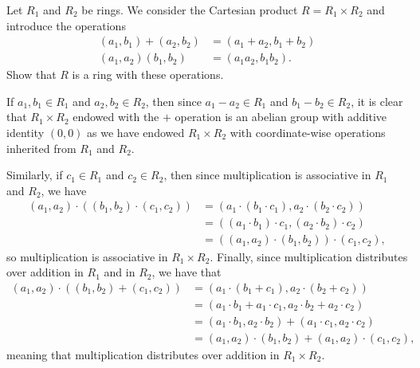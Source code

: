 \documentclass[10pt]{mypackage}
\begin{document}
\begin{problem}[Problem 4]
  Let $R_1$ and $R_2$ be rings. We consider the Cartesian product $R = R_1\times R_2$ and introduce the operations
  \begin{align*}
    \left( a_1,b_1 \right) + \left( a_2,b_2 \right) &= \left( a_1 + a_2,b_1 + b_2 \right)\\
    \left( a_1,a_2 \right)\left( b_1,b_2 \right) &= \left( a_1a_2,b_1b_2 \right).
  \end{align*}
  Show that $R$ is a ring with these operations.
\end{problem}
\begin{solution}
  If $a_1,b_1\in R_1$ and $a_2,b_2\in R_2$, then since $a_1 - a_2\in R_1$ and $b_1-b_2\in R_2$, it is clear that $R_1\times R_2$ endowed with the $+$ operation is an abelian group with additive identity $\left( 0,0 \right)$ as we have endowed $R_1\times R_2$ with coordinate-wise operations inherited from $R_1$ and $R_2$.\newline

  Similarly, if $c_1\in R_1$ and $c_2\in R_2$, then since multiplication is associative in $R_1$ and $R_2$, we have
  \begin{align*}
    \left( a_1,a_2 \right)\cdot \left( \left( b_1,b_2 \right)\cdot \left( c_1,c_2 \right) \right) &= \left( a_1\cdot \left( b_1\cdot c_1 \right),a_2\cdot \left( b_2\cdot c_2 \right) \right)\\
                                                                                                  &= \left( \left( a_1\cdot b_1 \right)\cdot c_1,\left( a_2\cdot b_2 \right)\cdot c_2 \right)\\
                                                                                                  &= \left( \left( a_1,a_2 \right)\cdot \left( b_1,b_2 \right) \right)\cdot \left( c_1,c_2 \right),
  \end{align*}
  so multiplication is associative in $R_1\times R_2$. Finally, since multiplication distributes over addition in $R_1$ and in $R_2$, we have that 
  \begin{align*}
    \left( a_1,a_2 \right)\cdot \left( \left( b_1,b_2 \right) + \left( c_1,c_2 \right) \right) &= \left( a_1\cdot \left( b_1 + c_1 \right),a_2\cdot \left( b_2 + c_2 \right) \right)\\
                                                                                               &= \left( a_1\cdot b_1 + a_1\cdot c_1,a_2\cdot b_2 + a_2\cdot c_2 \right)\\
                                                                                               &= \left( a_1\cdot b_1,a_2\cdot b_2 \right) + \left( a_1\cdot c_1,a_2\cdot c_2 \right)\\
                                                                                               &= \left( a_1,a_2 \right)\cdot \left( b_1,b_2 \right) + \left( a_1,a_2 \right)\cdot \left( c_1,c_2 \right),
  \end{align*}
  meaning that multiplication distributes over addition in $R_1\times R_2$.
\end{solution}
\end{document}
